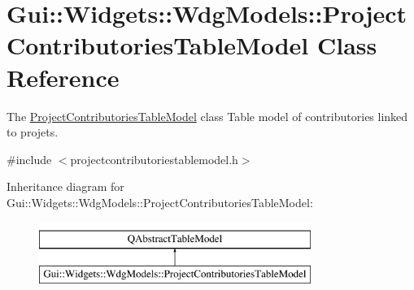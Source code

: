 \hypertarget{classGui_1_1Widgets_1_1WdgModels_1_1ProjectContributoriesTableModel}{}\section{Gui\+:\+:Widgets\+:\+:Wdg\+Models\+:\+:Project\+Contributories\+Table\+Model Class Reference}
\label{classGui_1_1Widgets_1_1WdgModels_1_1ProjectContributoriesTableModel}


The \hyperlink{classGui_1_1Widgets_1_1WdgModels_1_1ProjectContributoriesTableModel}{Project\+Contributories\+Table\+Model} class Table model of contributories linked to projets.  




{\ttfamily \#include $<$projectcontributoriestablemodel.\+h$>$}

Inheritance diagram for Gui\+:\+:Widgets\+:\+:Wdg\+Models\+:\+:Project\+Contributories\+Table\+Model\+:\begin{figure}[H]
\begin{center}
\leavevmode
\includegraphics[height=2.000000cm]{d9/d71/classGui_1_1Widgets_1_1WdgModels_1_1ProjectContributoriesTableModel}
\end{center}
\end{figure}
